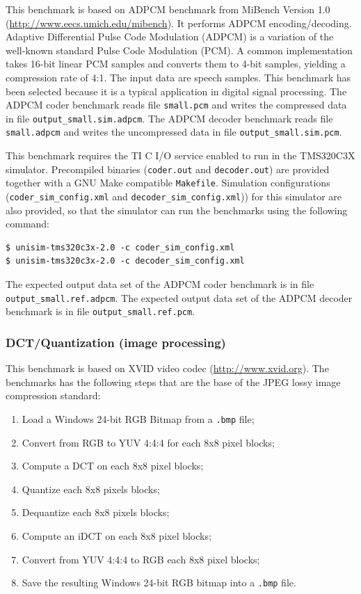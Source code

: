 This benchmark is based on ADPCM benchmark from MiBench Version 1.0 (\url{http://www.eecs.umich.edu/mibench}).
It performs ADPCM encoding/decoding. 
Adaptive Differential Pulse Code Modulation (ADPCM) is a variation of the well-known standard Pulse Code Modulation (PCM). 
A common implementation takes 16-bit linear PCM samples and converts them to 4-bit samples, yielding a compression rate of 4:1. 
The input data are speech samples.
This benchmark has been selected because it is a typical application in digital signal processing.
The ADPCM coder benchmark reads file \texttt{small.pcm} and writes the compressed data in file \texttt{output\_small.sim.adpcm}.
The ADPCM decoder benchmark reads file \texttt{small.adpcm} and writes the uncompressed data in file \texttt{output\_small.sim.pcm}.

This benchmark requires the TI C I/O service enabled to run in the TMS320C3X simulator.
Precompiled binaries (\texttt{coder.out} and \texttt{decoder.out}) are provided together with a GNU Make compatible \texttt{Makefile}.
Simulation configurations (\texttt{coder\_sim\_config.xml} and \texttt{decoder\_sim\_config.xml})) for this simulator are also provided, so that the simulator can run the benchmarks using the following command:

\begin{verbatim}
$ unisim-tms320c3x-2.0 -c coder_sim_config.xml
$ unisim-tms320c3x-2.0 -c decoder_sim_config.xml
\end{verbatim}

The expected output data set of the ADPCM coder benchmark is in file \texttt{output\_small.ref.adpcm}.
The expected output data set of the ADPCM decoder benchmark is in file \texttt{output\_small.ref.pcm}.

\subsubsection{DCT/Quantization (image processing)}

This benchmark is based on XVID video codec (\url{http://www.xvid.org}).
The benchmarks has the following steps that are the base of the JPEG lossy image compression standard:
\begin{enumerate}
\item Load a Windows 24-bit RGB Bitmap from a \texttt{.bmp} file;
\item Convert from RGB to YUV 4:4:4 for each 8x8 pixel blocks;
\item Compute a DCT on each 8x8 pixel blocks;
\item Quantize each 8x8 pixels blocks;
\item Dequantize each 8x8 pixels blocks;
\item Compute an iDCT on each 8x8 pixel blocks;
\item Convert from YUV 4:4:4 to RGB each 8x8 pixel blocks;
\item Save the resulting Windows 24-bit RGB bitmap into a \texttt{.bmp} file.
\end{enumerate}

